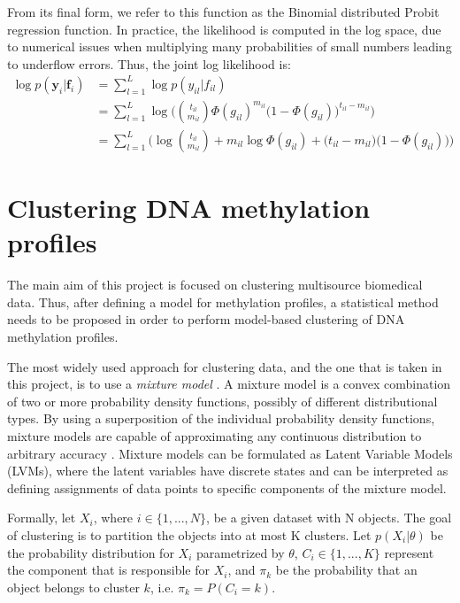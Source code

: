 From its final form, we refer to this function as the Binomial distributed Probit regression function. In practice, the likelihood is computed in the log space, due to numerical issues when multiplying many probabilities of small numbers leading to underflow errors. Thus, the joint log likelihood is:
\begin{equation} \label{likel-binom-prob-f}
  \begin{split}
	\log p(\mathbf{y}_{i}|\mathbf{f}_{i}) & = \sum_{l=1}^{L} \log p(y_{il}|f_{il}) \\
				& = \sum_{l=1}^{L} \log \bigg(\binom{t_{il}}{m_{il}} \Phi(g_{il})^{m_{il}} \big(1 - \Phi(g_{il})\big)^{t_{il} - m_{il}}\bigg) \\
				& = \sum_{l=1}^{L} \bigg(\log \binom{t_{il}}{m_{il}} + m_{il} \log \Phi(g_{il}) + \big(t_{il} - m_{il} \big) \big(1 - \Phi(g_{il})\big)\bigg)
  \end{split}
\end{equation}


\section{Clustering DNA methylation profiles}
The main aim of this project is focused on clustering multisource biomedical data. Thus, after defining a model for methylation profiles, a statistical method needs to be proposed in order to perform model-based clustering of DNA methylation profiles.

The most widely used approach for clustering data, and the one that is taken in this project, is to use a \emph{mixture model} \citep{McLachlan1988}. A mixture model is a convex combination of two or more probability density functions, possibly of different distributional types. By using a superposition of the individual probability density functions, mixture models are capable of approximating any continuous distribution to arbitrary accuracy \citep{Marin2005}. Mixture models can be formulated as Latent Variable Models (LVMs), where the latent variables have discrete states and can be interpreted as defining assignments of data points to specific components of the mixture model.

Formally, let $X_{i}$, where $i \in \lbrace 1, ... , N \rbrace$, be a given dataset with N objects. The goal of clustering is to partition the objects into at most K clusters. Let $p(X_{i}|\theta)$ be the probability distribution for $X_{i}$ parametrized by $\theta$, $C_{i} \in \lbrace 1,...,K \rbrace$ represent the  component that is responsible for $X_{i}$, and $\pi_{k}$ be the probability that an object belongs to cluster $k$, i.e. $\pi_{k} = P(C_{i} = k)$. 

